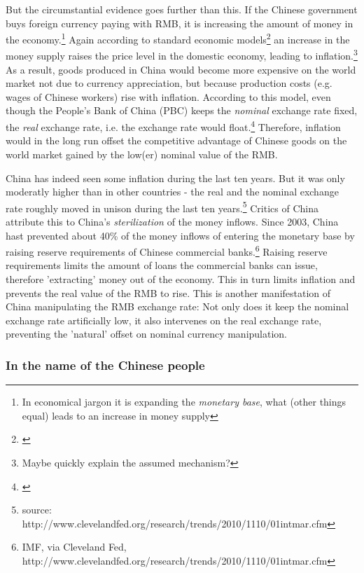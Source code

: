 \documentclass[11pt]{article}
\begin{document}
But the circumstantial evidence goes further than this. If the Chinese government buys foreign currency paying with RMB, it is increasing the amount of money in the economy.\footnote{In economical jargon it is expanding the \emph{monetary base}, what (other things equal) leads to an increase in money supply} Again according to standard economic models\footnote{\cite[pp. ?]{Krugman2008}} an increase in the money supply raises the price level in the domestic economy, leading to inflation.\footnote{Maybe quickly explain the assumed mechanism?} As a result, goods produced in China would become more expensive on the world market not due to currency appreciation, but because production costs (e.g. wages of Chinese workers) rise with inflation. According to this model, even though the People's Bank of China (PBC) keeps the \emph{nominal} exchange rate fixed, the \emph{real} exchange rate, i.e. the exchange rate would float.\footnote{\cite[p. 509]{Krugman}} Therefore, inflation would in the long run offset the competitive advantage of Chinese goods on the world market gained by the low(er) nominal value of the RMB.


China has indeed seen some inflation during the last ten years. But it was only moderatly higher than in other countries - the real and the nominal exchange rate roughly moved in unison during the last ten years.\footnote{source: http://www.clevelandfed.org/research/trends/2010/1110/01intmar.cfm}%
Critics of China attribute this to China's \emph{sterilization} of the money inflows. Since 2003, China hast prevented about 40\% of the money inflows of entering the monetary base by raising reserve requirements of Chinese commercial banks.\footnote{IMF, via Cleveland Fed, http://www.clevelandfed.org/research/trends/2010/1110/01intmar.cfm}%
Raising reserve requirements limits the amount of loans the commercial banks can issue, therefore 'extracting' money out of the economy. This in turn limits inflation and prevents the real value of the RMB to rise. This is another manifestation of China manipulating the RMB exchange rate: Not only does it keep the nominal exchange rate artificially low, it also intervenes on the real exchange rate, preventing the 'natural' offset on nominal currency manipulation.

\subsubsection{In the name of the Chinese people}
\end{document}
